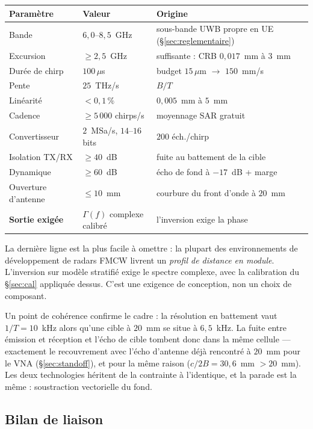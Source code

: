 \documentclass[11pt,a4paper]{article}
\begin{document}
\begin{table}[h]
\centering
\begin{tabular}{lll}
\toprule
Paramètre & Valeur & Origine \\
\midrule
Bande & $6{,}0$--$8{,}5$~GHz & sous-bande UWB propre en UE
  (\S\ref{sec:reglementaire}) \\
Excursion & $\ge 2{,}5$~GHz & suffisante : CRB $0{,}017$~mm à $3$~mm \\
Durée de chirp & $100\,\mu$s & budget $15\,\mu$m $\to$ $150$~mm/s \\
Pente & $25$~THz/s & $B/T$ \\
Linéarité & $< 0{,}1\,\%$ & $0{,}005$~mm à $5$~mm \\
Cadence & $\ge 5\,000$ chirps/s & moyennage SAR gratuit \\
Convertisseur & $2$~MSa/s, $14$--$16$ bits & $200$ éch./chirp \\
Isolation TX/RX & $\ge 40$~dB & fuite au battement de la cible \\
Dynamique & $\ge 60$~dB & écho de fond à $-17$~dB + marge \\
Ouverture d'antenne & $\le 10$~mm & courbure du front d'onde à $20$~mm \\
\textbf{Sortie exigée} & $\Gamma(f)$ complexe calibré & l'inversion
  exige la phase \\
\bottomrule
\end{tabular}
\end{table}

La dernière ligne est la plus facile à omettre : la plupart des
environnements de développement de radars FMCW livrent un \emph{profil de
distance en module}. L'inversion sur modèle stratifié exige le spectre complexe,
avec la calibration du \S\ref{sec:cal} appliquée dessus. C'est une exigence de
conception, non un choix de composant.

Un point de cohérence confirme le cadre : la résolution en battement vaut
$1/T = 10$~kHz alors qu'une cible à $20$~mm se situe à $6{,}5$~kHz. La fuite
entre émission et réception et l'écho de cible tombent donc dans la même
cellule --- exactement le recouvrement avec l'écho d'antenne déjà rencontré à
$20$~mm pour le VNA (\S\ref{sec:standoff}), et pour la même raison
($c/2B = 30{,}6$~mm $> 20$~mm). Les deux technologies héritent de la contrainte
à l'identique, et la parade est la même : soustraction vectorielle du fond.

\subsection{Bilan de liaison}
\label{sec:bilan}
\end{document}
